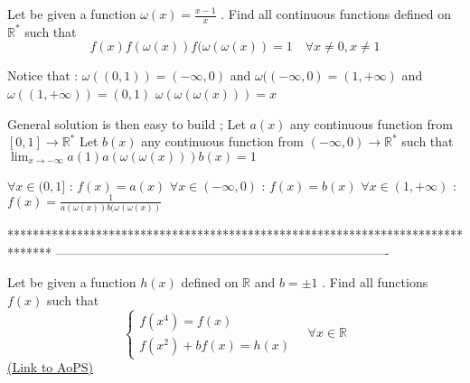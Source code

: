 \begin{solution}
	\begin{tcolorbox}Let be given a function $\omega (x)=\frac{x-1}{x}$  . Find all continuous functions  defined on  $ \mathbb{ R}^*$ such that
\[f(x)f(\omega (x))f(\omega (\omega (x))=1\quad \forall x\neq 0, x\neq 1\]\end{tcolorbox}
Notice that :
$\omega((0,1))=(-\infty,0)$ and $\omega((-\infty,0)=(1,+\infty)$ and $\omega((1,+\infty))=(0,1)$
$\omega(\omega(\omega(x)))=x$

General solution is then easy to build ;
Let $a(x)$ any continuous function from $[0,1]\to \mathbb R^*$
Let $b(x)$ any continuous function from $(-\infty,0)\to\mathbb R^*$ such that $\lim_{x\to-\infty}a(1)a(\omega(\omega(x)))b(x)=1$

$\forall x\in(0,1]$ : $f(x)=a(x)$
$\forall x\in(-\infty,0)$ : $f(x)=b(x)$
$\forall x\in(1,+\infty)$ : $f(x)=\frac 1{a(\omega(x))b(\omega(\omega(x))}$
\end{solution}
*******************************************************************************
-------------------------------------------------------------------------------

\begin{problem}
	Let be given a function $h(x)$ defined on  $ \mathbb{ R}$ and $b= \pm1$ . Find all  functions $f(x)$ such that \[\begin{cases}f(x^4)=f(x)\\f(x^2)+bf(x)=h(x) \end{cases}\quad \forall x\in\mathbb R\]
	\flushright \href{https://artofproblemsolving.com/community/c6h569101}{(Link to AoPS)}
\end{problem}



